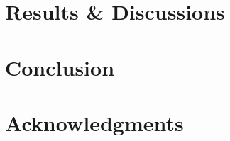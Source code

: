 \documentclass[twocolumn, switch]{article}
\begin{document}
\lipsum[1] \cite{kour2014real} 

\section{Results \& Discussions}
\label{sec:test}

\lipsum[1]

\section{Conclusion}
\label{sec:conclusion}

\lipsum[1]

\section*{Acknowledgments}

\lipsum[1]



  
\end{document}

